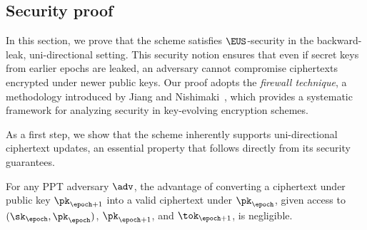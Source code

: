 \documentclass{fundam}
\begin{document}
\subsection{Security proof}
%
In this section, we prove that the scheme satisfies $\EUS$-security in the backward-leak, uni-directional setting. This security notion ensures that even if secret keys from earlier epochs are leaked, an adversary cannot compromise ciphertexts encrypted under newer public keys. Our proof adopts the \emph{firewall technique}, a methodology introduced by Jiang and Nishimaki~\cite{jiang2020,nishimaki2022direction}, which provides a systematic framework for analyzing security in key-evolving encryption schemes.

As a first step, we show that the scheme inherently supports uni-directional ciphertext updates, an essential property that follows directly from its security guarantees.

\begin{theorem}
	For any PPT adversary $\adv$, the advantage of converting a ciphertext under public key $\pk_{\epoch+1}$ into a valid ciphertext under $\pk_{\epoch}$, given access to $(\sk_{\epoch}, \pk_{\epoch})$, $\pk_{\epoch+1}$, and $\tok_{\epoch+1}$, is negligible.
\end{theorem}
\end{document}
